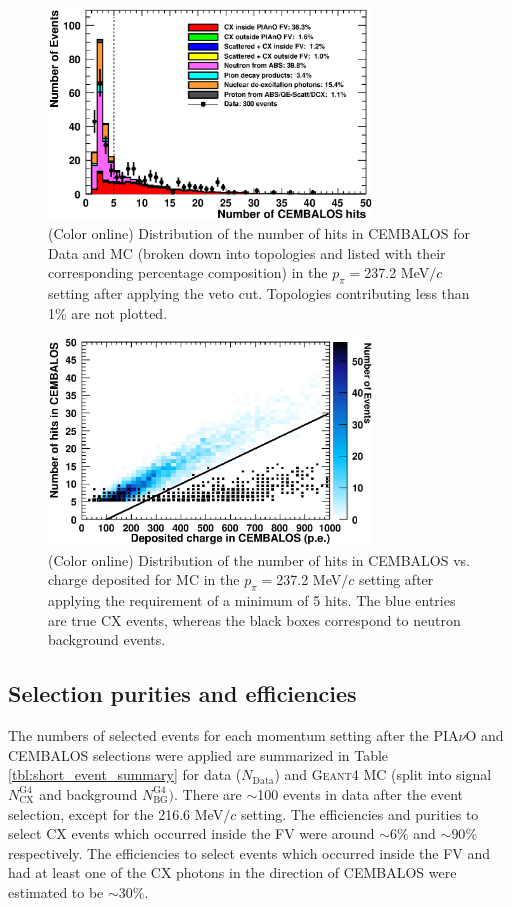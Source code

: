 \begin{figure}[ht]
 \includegraphics[width=86mm]{figures/duettag_nhits_20000_forpaper_v4.eps}
 \caption{(Color online) Distribution of the number of hits in CEMBALOS for Data and MC (broken down into topologies and listed with their corresponding percentage composition) in the $p_\pi=$237.2 MeV$/c$ setting after applying the veto cut. Topologies contributing less than 1\% are not plotted.}
 \label{fig:nhits}
\end{figure}

\begin{figure}[ht]
 \includegraphics[width=86mm]{figures/draw2Dcut_draw.eps}
 \caption{(Color online) Distribution of the number of hits in CEMBALOS vs. charge deposited for MC in the $p_\pi=$237.2 MeV$/c$ setting after applying the requirement of a minimum of 5 hits. The blue entries are true CX events, whereas the black boxes correspond to neutron background events.}
 \label{fig:nhitsvsCharge}
\end{figure}

\subsection{Selection purities and efficiencies}
The numbers of selected events for each momentum setting after the PIA$\nu$O and CEMBALOS selections were applied are summarized in Table \ref{tbl:short_event_summary} for data ($N_{\mathrm{Data}}$) and  \textsc{Geant4} MC (split into signal $N_{\mathrm{CX}}^{\mathrm{G4}}$ and background $N_{\mathrm{BG}}^{\mathrm{G4}})$. There are $\sim$100 events in data after the event selection, except for the 216.6 MeV$/c$ setting. The efficiencies and purities to select CX events which occurred inside the FV were around $\sim6\%$ and $\sim90\%$ respectively.  The efficiencies to select events which occurred inside the FV and had at least one of the CX photons in the direction of CEMBALOS were estimated to be $\sim30\%$.

